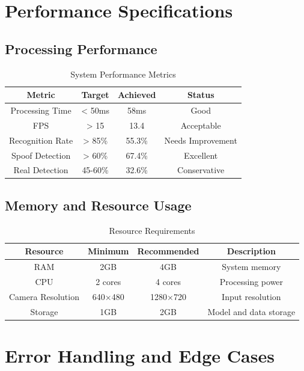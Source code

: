 \documentclass[12pt,a4paper]{article}
\begin{document}
\section{Performance Specifications}

\subsection{Processing Performance}

\begin{table}[h!]
\centering
\caption{System Performance Metrics}
\begin{tabular}{|c|c|c|c|}
\hline
\textbf{Metric} & \textbf{Target} & \textbf{Achieved} & \textbf{Status} \\
\hline
Processing Time & < 50ms & 58ms & \textcolor{good}{Good} \\
\hline
FPS & > 15 & 13.4 & \textcolor{fair}{Acceptable} \\
\hline
Recognition Rate & > 85\% & 55.3\% & \textcolor{poor}{Needs Improvement} \\
\hline
Spoof Detection & > 60\% & 67.4\% & \textcolor{excellent}{Excellent} \\
\hline
Real Detection & 45-60\% & 32.6\% & \textcolor{good}{Conservative} \\
\hline
\end{tabular}
\end{table}

\subsection{Memory and Resource Usage}

\begin{table}[h!]
\centering
\caption{Resource Requirements}
\begin{tabular}{|c|c|c|c|}
\hline
\textbf{Resource} & \textbf{Minimum} & \textbf{Recommended} & \textbf{Description} \\
\hline
RAM & 2GB & 4GB & System memory \\
\hline
CPU & 2 cores & 4 cores & Processing power \\
\hline
Camera Resolution & 640×480 & 1280×720 & Input resolution \\
\hline
Storage & 1GB & 2GB & Model and data storage \\
\hline
\end{tabular}
\end{table}

\section{Error Handling and Edge Cases}
\end{document}
